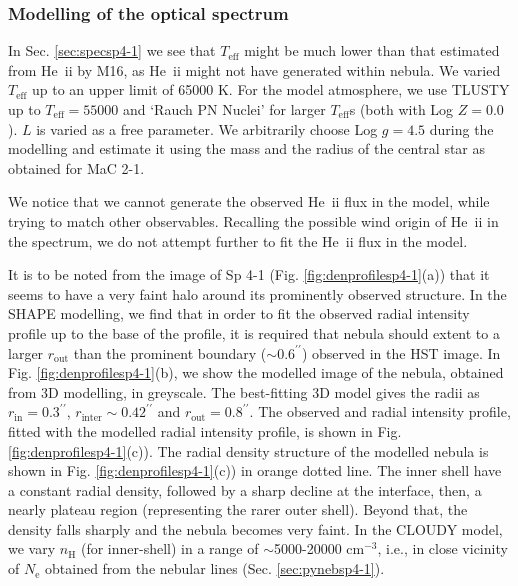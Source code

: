 \documentclass[a4paper,fleqn,usenatbib]{mnras}
\begin{document}
\subsubsection{Modelling of the optical spectrum}
In Sec. \ref{sec:specsp4-1} we see that $T_\mathrm{eff}$ might be much lower than that estimated from He~{\sc ii} by M16, as He~{\sc ii} might not have generated within nebula. We varied $T_\mathrm{eff}$ up to an upper limit of 65000 K. For the model atmosphere, we use TLUSTY up to $T_\mathrm{eff}=55000$ and `Rauch PN Nuclei' \citep{2003A&A...403..709R} for larger $T_\mathrm{eff}$s (both with Log $Z=0.0$). $L$ is varied as a free parameter. We arbitrarily choose Log $g=4.5$ during the modelling and estimate it using the mass and the radius of the central star as obtained for MaC 2-1.

We notice that we cannot generate the observed He~{\sc ii} flux in the model, while trying to match other observables. Recalling the possible wind origin of He~{\sc ii} in the spectrum, we do not attempt further to fit the He~{\sc ii} flux in the model. 

It is to be noted from the image of Sp 4-1 (Fig. \ref{fig:denprofilesp4-1}(a)) that it seems to have a very faint halo around its prominently observed structure. In the SHAPE modelling, we find that in order to fit the observed radial intensity profile up to the base of the profile, it is required that nebula should extent to a larger $r_\mathrm{out}$ than the prominent boundary ($\sim0.6^{\prime\prime}$) observed in the HST image. In Fig. \ref{fig:denprofilesp4-1}(b), we show the modelled image of the nebula, obtained from 3D modelling, in greyscale. The best-fitting 3D model gives the radii as $r_\mathrm{in}=0.3^{\prime\prime}$, $r_\mathrm{inter}\sim0.42^{\prime\prime}$ and $r_\mathrm{out}=0.8^{\prime\prime}$. The observed and radial intensity profile, fitted with the modelled radial intensity profile, is shown in Fig. \ref{fig:denprofilesp4-1}(c)). The radial density structure of the modelled nebula is shown in Fig. \ref{fig:denprofilesp4-1}(c)) in orange dotted line. The inner shell have a constant radial density, followed by a sharp decline at the interface, then, a nearly plateau region (representing the rarer outer shell). Beyond that, the density falls sharply and the nebula becomes very faint. In the CLOUDY model, we vary $n_\mathrm{H}$ (for inner-shell) in a range of $\sim$5000-20000 cm$^{-3}$, i.e., in close vicinity of $N_\mathrm{e}$ obtained from the nebular lines (Sec. \ref{sec:pynebsp4-1}). 
\end{document}
